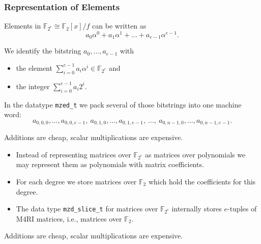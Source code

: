 \documentclass[11pt]{beamer}
\newcommand{\field}[1]{\mathbb{#1}}
\newcommand{\F}{\ensuremath{\field{F}}\xspace}
\newcommand{\FZ}{\ensuremath{\field{F}_2}\xspace}
\newcommand{\FZE}{\ensuremath{\field{F}_{2^e}}\xspace}
\newcommand{\mzedt}{\texttt{mzed\_t}\xspace}
\newcommand{\mzdslicet}{\texttt{mzd\_slice\_t}\xspace}
\begin{document}
\begin{frame}[allowframebreaks]
\frametitle{Representation of Elements} 


Elements in $\F_{2^e} \cong \F_2[x]/f$ can be written as $$a_0 \alpha^0 + a_1 \alpha^1 + \dots + a_{e-1} \alpha^{e-1}.$$

\vspace{1em}

We identify the bitstring $a_0,\dots,a_{e-1}$ with
 \begin{itemize}
  \item the element $\sum_{i=0}^{e-1} a_i \alpha^i \in \F_{2^e}$ and
  \item the integer $\sum_{i=0}^{e-1} a_i 2^i$.
 \end{itemize}

\vspace{1em}

In the datatype \mzedt we pack several of those bitstrings into one machine word: 
$$a_{0,0,0},\dots,a_{0,0,e-1},\ a_{0,1,0},\dots,a_{0,1,e-1},\ \dots,\ a_{0,n-1,0},\dots,a_{0,n-1,e-1}.$$

\begin{block}{}
Additions are cheap, scalar multiplications are expensive.
\end{block}

\framebreak

\begin{itemize}
\item Instead of representing matrices over \FZE as matrices over polynomials we may represent them as polynomials with matrix coefficients. 
\item For each degree we store matrices over \FZ which hold the coefficients for this degree. 
\item The data type \mzdslicet for matrices over $\FZE$ internally stores $e$-tuples of M4RI matrices, i.e., matrices over \FZ.
\end{itemize}

\begin{block}{}
Additions are cheap, scalar multiplications are expensive. 
\end{block}

\framebreak


\end{frame}
\end{document}
